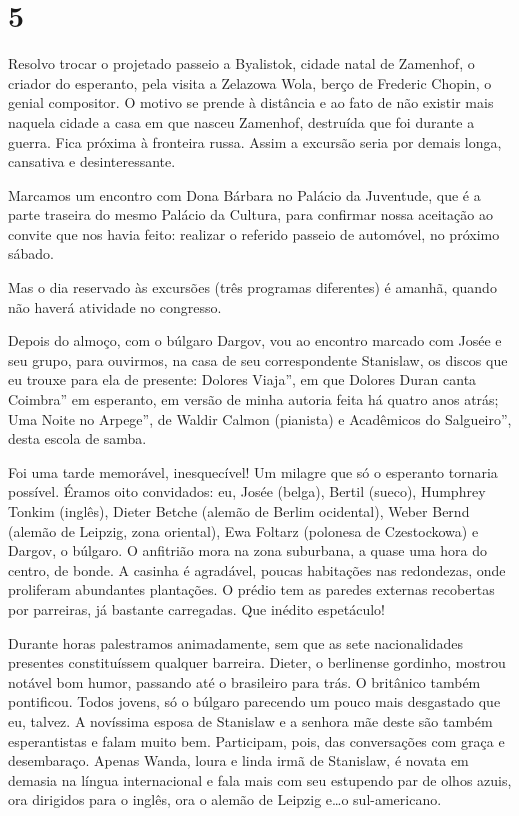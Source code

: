 \section*{5 \adfflatleafright {}}
Resolvo trocar o projetado passeio a Byalistok, cidade natal de Zamenhof, o criador do esperanto, pela visita a Zelazowa Wola, berço de Frederic Chopin, o genial compositor. O motivo se prende à distância e ao fato de não existir mais naquela cidade a casa em que nasceu Zamenhof, destruída que foi durante a guerra. Fica próxima à fronteira russa. Assim a excursão seria por demais longa, cansativa e desinteressante.

Marcamos um encontro com Dona Bárbara no Palácio da Juventude, que é a parte traseira do mesmo Palácio da Cultura, para confirmar nossa aceitação ao convite que nos havia feito: realizar o referido passeio de automóvel, no próximo sábado.

Mas o dia reservado às excursões (três programas diferentes) é amanhã, quando não haverá atividade no congresso.

Depois do almoço, com o búlgaro Dargov, vou ao encontro marcado com Josée e seu grupo, para ouvirmos, na casa de seu correspondente Stanislaw, os discos que eu trouxe para ela de presente: Dolores Viaja'', em que Dolores Duran canta Coimbra'' em esperanto, em versão de minha autoria feita há quatro anos atrás; Uma Noite no Arpege'', de Waldir Calmon (pianista) e Acadêmicos do Salgueiro'', desta escola de samba.

Foi uma tarde memorável, inesquecível! Um milagre que só o esperanto tornaria possível. Éramos oito convidados: eu, Josée (belga), Bertil (sueco), Humphrey Tonkim (inglês), Dieter Betche (alemão de Berlim ocidental), Weber Bernd (alemão de Leipzig, zona oriental), Ewa Foltarz (polonesa de Czestockowa) e Dargov, o búlgaro. O anfitrião mora na zona suburbana, a quase uma hora do centro, de bonde. A casinha é agradável, poucas habitações nas redondezas, onde proliferam abundantes plantações. O prédio tem as paredes externas recobertas por parreiras, já bastante carregadas. Que inédito espetáculo!

Durante horas palestramos animadamente, sem que as sete nacionalidades presentes constituíssem qualquer barreira. Dieter, o berlinense gordinho, mostrou notável bom humor, passando até o brasileiro para trás. O britânico também pontificou. Todos jovens, só o búlgaro parecendo um pouco mais desgastado que eu, talvez. A novíssima esposa de Stanislaw e a senhora mãe deste são também esperantistas e falam muito bem. Participam, pois, das conversações com graça e desembaraço. Apenas Wanda, loura e linda irmã de Stanislaw, é novata em demasia na língua internacional e fala mais com seu estupendo par de olhos azuis, ora dirigidos para o inglês, ora o alemão de Leipzig e\ldots o sul-americano.

